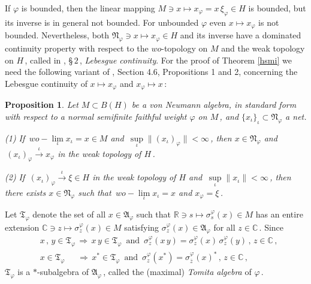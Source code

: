 \documentclass[reqno]{amsart}
\newtheorem{proposition}[theorem]{Proposition}
\theoremstyle{definition}
\theoremstyle{remark}
\numberwithin{equation}{section}
\theoremstyle{plain}
\begin{document}
If $\varphi$ is bounded, then the linear mapping $M\ni x\longmapsto
x_\varphi =x\,\xi_\varphi\in H$ is bounded, but its inverse is in
general not bounded. For unbounded $\varphi$ even $x\longmapsto
x_\varphi$ is not bounded. Nevertheless, both $\mathfrak N_\varphi
\ni x\longmapsto x_\varphi\in H$ and its inverse have a dominated
continuity property with respect to the $wo$-topology on $M$ and
the weak topology on $H\,$, called in \cite{Z1}, \S $\, 2\,$,
\emph{Lebesgue continuity}.
For the proof of Theorem \ref{hsmi} we need the following variant
of \cite{Z1}, Section 4.6, Propositions 1 and 2, concerning the
Lebesgue continuity of $x\longmapsto x_\varphi$ and
$x_\varphi\longmapsto x\,$:
\smallskip

\begin{proposition}\label{Leb}
Let $M\subset B(H)$ be a von Neumann algebra, in standard form with
respect to a normal semifinite faithful weight $\varphi$ on $M\,$,
and $\{ x_\iota\}_\iota\subset\mathfrak N_\varphi$ a net.

{\rm (1)} If $\, wo-\lim\limits_\iota x_\iota =x\in M$ and
$\,\sup\limits_\iota \| (x_\iota)_\varphi\| <\infty\,$, then
$x\in\mathfrak N_\varphi$ and $\, (x_\iota)_\varphi
\overset{\iota}{\longrightarrow} x_\varphi$ in the weak topology of
$H\,$.

{\rm (2)} If $\, (x_\iota)_\varphi \overset{\iota}{\longrightarrow}
\xi\in H$ in the weak topology of $H$ and $\,\sup\limits_\iota
\| x_\iota\| <\infty\,$, then there exists
$x\in\mathfrak N_\varphi$ such that $\, wo-\lim\limits_\iota
x_\iota =x$ and $x_\varphi =\xi\,$.
\end{proposition}
\smallskip

Let $\mathfrak T_\varphi$ denote the set of all
$x\in\mathfrak A_\varphi$ such that $\mathbb R\ni s\longmapsto
\sigma^\varphi_s (x)\in M$ has an entire extension $\mathbb C\ni
z\longmapsto\sigma^\varphi_z (x)\in M$ satisfying
$\sigma^\varphi_z (x)\in\mathfrak A_\varphi$ for all
$z\in\mathbb C\,$. Since
\begin{align*}
&x\, ,\, y\in\mathfrak T_\varphi\,\Longrightarrow\,
x\, y\in\mathfrak T_\varphi\,\text{ and }\,\sigma^\varphi_z (x\, y)
=\sigma^\varphi_z (x)\,\sigma^\varphi_z (y)\, ,\, z\in\mathbb C\, ,\\
&x\in\mathfrak T_\varphi\phantom{xx}\,\,
\Longrightarrow\,x^*\in\mathfrak T_\varphi\,
\text{ and }\,\sigma^\varphi_z (x^*)=\sigma^\varphi_{\overline z}
(x)^*\, ,\, z\in\mathbb C\, ,
\end{align*}
$\mathfrak T_\varphi$ is a $*$-subalgebra of $\mathfrak A_\varphi\,$,
called the (maximal) \emph{Tomita algebra} of $\varphi\,$.
\end{document}
